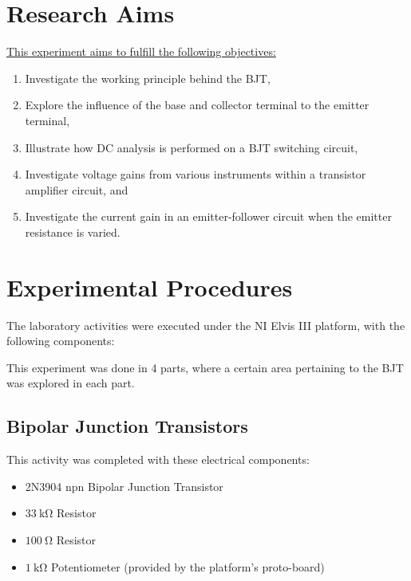 \documentclass[11pt]{report}
\begin{document}
\section{Research Aims}
\underline{This experiment aims to fulfill the following objectives:}
\begin{enumerate}
	\itemsep 0em
	\item Investigate the working principle behind the BJT,
	\item Explore the influence of the base and collector terminal to the emitter terminal,
	\item Illustrate how DC analysis is performed on a BJT switching circuit,
	\item Investigate voltage gains from various instruments within a transistor amplifier circuit, and
	\item Investigate the current gain in an emitter-follower circuit when the emitter resistance is varied.
\end{enumerate}

\section{Experimental Procedures}
The laboratory activities were executed under the NI Elvis III platform, with the following components:

This experiment was done in 4 parts, where a certain area pertaining to the BJT was explored in each part.
\subsection{Bipolar Junction Transistors}
This activity was completed with these electrical components:
\begin{itemize}
	\itemsep 0em
	\item 2N3904 npn Bipolar Junction Transistor
	\item $\SI{33}{\kilo\ohm}$ Resistor
	\item $\SI{100}{\ohm}$ Resistor
	\item $\SI{1}{\kilo\ohm}$ Potentiometer (provided by the platform's proto-board)
\end{itemize}
\end{document}

